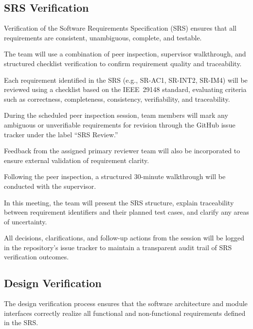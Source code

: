 \documentclass[12pt, titlepage]{article}
\begin{document}
\subsection{SRS Verification}
\label{subsec:srs-verification}


Verification of the Software Requirements Specification (SRS) ensures that all
requirements are consistent, unambiguous, complete, and testable.

The team will use a combination of peer inspection, supervisor walkthrough, and
structured checklist verification to confirm requirement quality and
traceability.

Each requirement identified in the SRS (e.g., SR-AC1, SR-INT2, SR-IM4) will be
reviewed using a checklist based on the IEEE~29148 standard, evaluating criteria
such as correctness, completeness, consistency, verifiability, and
traceability.

During the scheduled peer inspection session, team members will mark any
ambiguous or unverifiable requirements for revision through the GitHub issue
tracker under the label ``SRS Review.''

Feedback from the assigned primary reviewer team will also be incorporated to
ensure external validation of requirement clarity.

Following the peer inspection, a structured 30-minute walkthrough will be
conducted with the supervisor.

In this meeting, the team will present the SRS structure, explain traceability
between requirement identifiers and their planned test cases, and clarify any
areas of uncertainty.

All decisions, clarifications, and follow-up actions from the session will be
logged in the repository’s issue tracker to maintain a transparent audit trail
of SRS verification outcomes.

\subsection{Design Verification}
\label{subsec:design-verification}
The design verification process ensures that the software architecture and
module interfaces correctly realize all functional and non-functional
requirements defined in the SRS.
\end{document}
